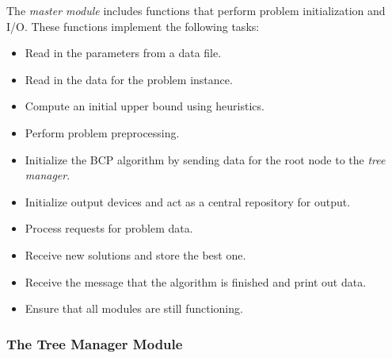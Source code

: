 The {\em master module} includes functions that perform problem
initialization and I/O. These functions implement the
following tasks:
\begin{itemize}
        \item Read in the parameters from a data file.
        \item Read in the data for the problem instance.
        \item Compute an initial upper bound using heuristics.
        \item Perform problem preprocessing.
        \item Initialize the BCP algorithm by sending data
        for the root node to the {\em tree manager}.
        \item Initialize output devices and act as a central
        repository for output.
        \item Process requests for problem data.
        \item Receive new solutions and store the best one.
        \item Receive the message that the algorithm is finished and
        print out data.
        \item Ensure that all modules are still functioning.
\end{itemize}

\subsubsection{The Tree Manager Module}

